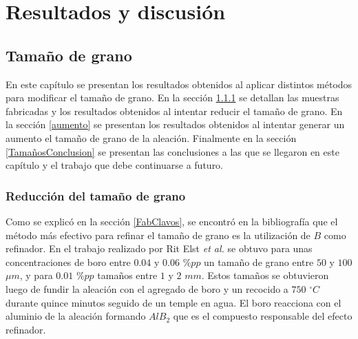 \documentclass[a4paper,12pt,fleqn,twoside,openany]{book}
\begin{document}
% 



\chapter{Resultados y discusión}
\label{sec:resultados}


\section{Tamaño de grano}

En este capítulo se presentan los resultados obtenidos al aplicar distintos métodos para modificar el tamaño de grano. En la sección \ref{reduccion} se detallan las muestras fabricadas y los resultados obtenidos al intentar reducir el tamaño de grano. En la sección \ref{aumento} se presentan los resultados obtenidos al intentar generar un aumento el tamaño de grano de la aleación. Finalmente en la sección \ref{TamañosConclusion} se presentan las conclusiones a las que se llegaron en este capítulo y el trabajo que debe continuarse a futuro. 



\subsection{Reducción del tamaño de grano} \label{reduccion}

Como se explicó en la sección \ref{FabClavos}, se encontró en la bibliografía que el método más efectivo para refinar el tamaño de grano es la utilización de $B$ como refinador. En el trabajo realizado por Rit Elst \textit{et al.} \cite{ritelst} se obtuvo para unas concentraciones de boro entre $0.04$ y $0.06$ $\% pp$ un tamaño de grano entre $50$ y $100$ $\mu m$, y para $0.01$ $\%pp$ tamaños entre $1$ y $2$ $mm$. Estos tamaños se obtuvieron luego de fundir la aleación con el agregado de boro y un recocido a $750$ $^\circ C$ durante quince minutos seguido de un temple en agua. El boro reacciona con el aluminio de la aleación formando $AlB_2$ que es el compuesto responsable del efecto refinador. 
\end{document}
